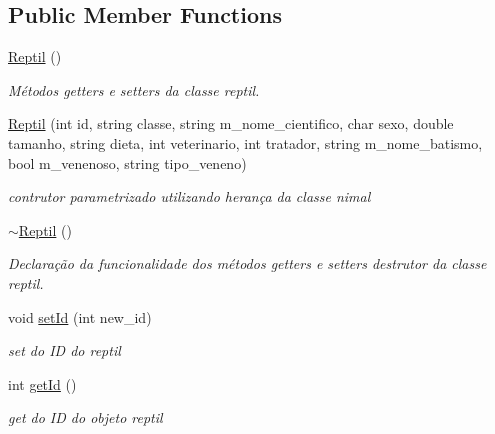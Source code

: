 \subsection*{Public Member Functions}
\begin{DoxyCompactItemize}
\item 
\mbox{\label{class_reptil_a8d4e391e335678b7ed64eda95e050553}} 
\mbox{\hyperlink{class_reptil_a8d4e391e335678b7ed64eda95e050553}{Reptil}} ()
\begin{DoxyCompactList}\small\item\em Métodos getters e setters da classe reptil. \end{DoxyCompactList}\item 
\mbox{\label{class_reptil_a697cb2f403de74d136d1fe81369dc0dc}} 
\mbox{\hyperlink{class_reptil_a697cb2f403de74d136d1fe81369dc0dc}{Reptil}} (int id, string classe, string m\+\_\+nome\+\_\+cientifico, char sexo, double tamanho, string dieta, int veterinario, int tratador, string m\+\_\+nome\+\_\+batismo, bool m\+\_\+venenoso, string tipo\+\_\+veneno)
\begin{DoxyCompactList}\small\item\em contrutor parametrizado utilizando herança da classe nimal \end{DoxyCompactList}\item 
\mbox{\label{class_reptil_a826ed679cc45f74fefecef7d4d40b409}} 
\mbox{\hyperlink{class_reptil_a826ed679cc45f74fefecef7d4d40b409}{$\sim$\+Reptil}} ()
\begin{DoxyCompactList}\small\item\em Declaração da funcionalidade dos métodos getters e setters destrutor da classe reptil. \end{DoxyCompactList}\item 
void \mbox{\hyperlink{class_reptil_a43569ac6f03199c92e40b8f907b65d7e}{set\+Id}} (int new\+\_\+id)
\begin{DoxyCompactList}\small\item\em set do ID do reptil \end{DoxyCompactList}\item 
int \mbox{\hyperlink{class_reptil_a773549483c3a5588f96937606401d9af}{get\+Id}} ()
\begin{DoxyCompactList}\small\item\em get do ID do objeto reptil \end{DoxyCompactList}\item 

\end{DoxyCompactItemize}
